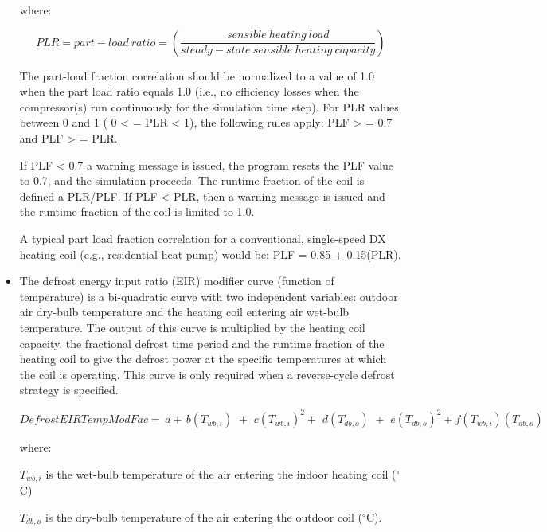 \begin{itemize}
where:

\begin{equation}
PLR = part-load~ratio = \left( {\frac{{sensible~heating~load}}{{steady-state~sensible~heating~capacity}}} \right)
\end{equation}

The part-load fraction correlation should be normalized to a value of 1.0 when the part load ratio equals 1.0 (i.e., no efficiency losses when the compressor(s) run continuously for the simulation time step). For PLR values between 0 and 1 ( 0 \textless{} = PLR \textless{} 1), the following rules apply:  PLF \textgreater{} = 0.7 and PLF \textgreater{} = PLR.

If PLF \textless{} 0.7 a warning message is issued, the program resets the PLF value to 0.7, and the simulation proceeds. The runtime fraction of the coil is defined a PLR/PLF. If PLF \textless{} PLR, then a warning message is issued and the runtime fraction of the coil is limited to 1.0.

A typical part load fraction correlation for a conventional, single-speed DX heating coil (e.g., residential heat pump) would be:  PLF = 0.85 + 0.15(PLR).

  \item
The defrost energy input ratio (EIR) modifier curve (function of temperature) is a bi-quadratic curve with two independent variables: outdoor air dry-bulb temperature and the heating coil entering air wet-bulb temperature. The output of this curve is multiplied by the heating coil capacity, the fractional defrost time period and the runtime fraction of the heating coil to give the defrost power at the specific temperatures at which the coil is operating. This curve is only required when a reverse-cycle defrost strategy is specified.

\begin{equation}
DefrostEIRTempModFac = \,a + \,b\left( {{T_{wb,i}}} \right)\,\, + \,\,c{\left( {{T_{wb,i}}} \right)^2} + \,\,d\left( {{T_{db,o}}} \right)\,\, + \,\,e{\left( {{T_{db,o}}} \right)^2} + f\left( {{T_{wb,i}}} \right)\left( {{T_{db,o}}} \right)
\label{eq:SSEHPDXAirHeatCoilDefrostEIRTempModFac}
\end{equation}

where:

\({T_{wb,i}}\) is the wet-bulb temperature of the air entering the indoor heating coil (\(^{\circ}\)C)

\({T_{db,o}}\) is the dry-bulb temperature of the air entering the outdoor coil (\(^{\circ}\)C).
\end{itemize}

